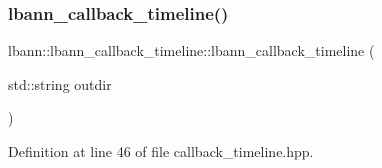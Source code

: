 \subsubsection{\texorpdfstring{lbann\+\_\+callback\+\_\+timeline()}{lbann\_callback\_timeline()}\hspace{0.1cm}{\footnotesize\ttfamily [1/2]}}
{\footnotesize\ttfamily lbann\+::lbann\+\_\+callback\+\_\+timeline\+::lbann\+\_\+callback\+\_\+timeline (\begin{DoxyParamCaption}\item[{std\+::string}]{outdir }\end{DoxyParamCaption})\hspace{0.3cm}{\ttfamily [inline]}}



Definition at line 46 of file callback\+\_\+timeline.\+hpp.


